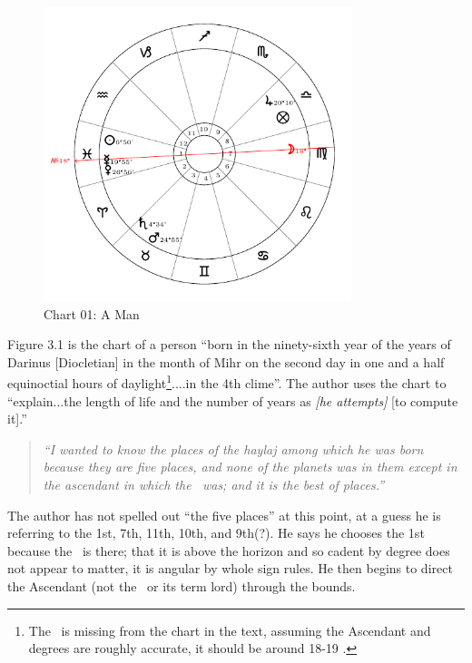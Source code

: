 \vspace{-1em}
\begin{figure}[H]
\centering
\includegraphics[width=0.8\textwidth]{charts/3_1_01}
\vspace{-1em}
\caption{Chart 01: A Man}
\end{figure}

Figure 3.1 is the chart of a person ``born in the ninety-sixth year of the years of Darinus [Diocletian] in the month of Mihr on the second day in one and a half equinoctial hours of daylight\footnote{The \Moon\, is missing from the chart in the text, assuming the Ascendant and \Sun\, degrees are roughly accurate, it should be around 18-19 \Virgo.}....in the 4th clime''. The author uses the chart to ``explain...the length of life and the number of years as \textsl{[he attempts]} [to compute it].''

\begin{quote}
\textsl{``I  wanted to know the places of the haylaj among which he was born because they are five places, and none of the planets was in them except in the ascendant in which the \Sun\, was; and it is the best of places.''}
\end{quote}

The author has not spelled out ``the five places'' at this point, at a guess he is referring to the 1st, 7th, 11th, 10th, and 9th(?).  He says he chooses the 1st because the \Sun\, is there; that it is above the horizon and so cadent by degree does not appear to matter, it is angular by whole sign rules. He then begins to direct the Ascendant (not the \Sun\, or its term lord) through the bounds.

